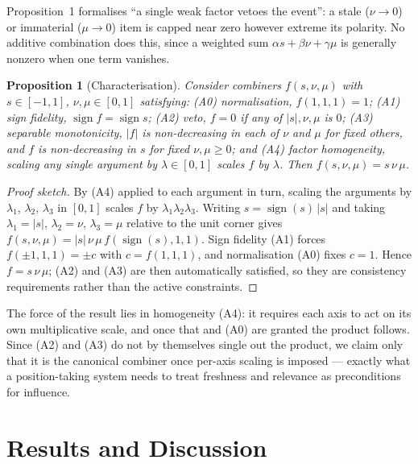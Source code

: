 \documentclass[12pt,a4paper]{article}
\newtheorem{proposition}{Proposition}
\begin{document}
Proposition~1 formalises ``a single weak factor vetoes the event'': a stale
($\nu\!\to\!0$) or immaterial ($\mu\!\to\!0$) item is capped near zero however
extreme its polarity. No additive combination does this, since a weighted sum
$\alpha s+\beta\nu+\gamma\mu$ is generally nonzero when one term vanishes.

\begin{singlespace}
\begin{proposition}[Characterisation]
Consider combiners $f(s,\nu,\mu)$ with $s\in[-1,1]$, $\nu,\mu\in[0,1]$ satisfying:
(A0) \emph{normalisation}, $f(1,1,1)=1$; (A1) \emph{sign fidelity},
$\operatorname{sign} f=\operatorname{sign} s$; (A2) \emph{veto}, $f=0$ if any of
$|s|,\nu,\mu$ is $0$; (A3) \emph{separable monotonicity}, $|f|$ is non-decreasing in
each of $\nu$ and $\mu$ for fixed others, and $f$ is non-decreasing in $s$ for fixed
$\nu,\mu\ge0$; and (A4) \emph{factor homogeneity}, scaling any single argument by
$\lambda\in[0,1]$ scales $f$ by $\lambda$. Then $f(s,\nu,\mu)=s\,\nu\,\mu$.
\end{proposition}

\begin{proof}[Proof sketch]
By (A4) applied to each argument in turn, scaling the arguments by $\lambda_1$,
$\lambda_2$, $\lambda_3$ in $[0,1]$ scales $f$ by $\lambda_1\lambda_2\lambda_3$.
Writing
$s=\operatorname{sign}(s)\,|s|$ and taking $\lambda_1=|s|$, $\lambda_2=\nu$,
$\lambda_3=\mu$ relative to the unit corner gives
$f(s,\nu,\mu)=|s|\,\nu\,\mu\,f(\operatorname{sign}(s),1,1)$. Sign fidelity (A1)
forces $f(\pm1,1,1)=\pm c$ with $c=f(1,1,1)$, and normalisation (A0) fixes $c=1$.
Hence $f=s\,\nu\,\mu$; (A2) and (A3) are then automatically satisfied, so they are
consistency requirements rather than the active constraints.
\end{proof}
\end{singlespace}

The force of the result lies in homogeneity (A4): it requires each axis to act on
its own multiplicative scale, and once that and (A0) are granted the product
follows. Since (A2) and (A3) do not by themselves single out the product, we claim
only that it is the canonical combiner once per-axis scaling is imposed --- exactly
what a position-taking system needs to treat freshness and relevance as
preconditions for influence.

\section{Results and Discussion}
\end{document}

